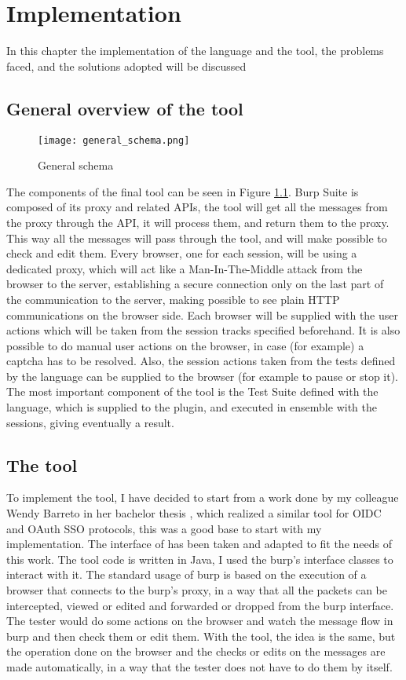 \chapter{Implementation}
\label{chap:Implementation}
In this chapter the implementation of the language and the tool, the problems faced, and the solutions adopted will be discussed

\section{General overview of the tool}
\begin{figure}
    \texttt{[image: general\_schema.png]}
    \caption{General schema}
    \label{fig:general_schema}
\end{figure}

The components of the final tool can be seen in Figure \ref{fig:general_schema}. Burp Suite is composed of its proxy and related APIs, the tool will get all the messages from the proxy through the API, it will process them, and return them to the proxy. This way all the messages will pass through the tool, and will make possible to check and edit them.
Every browser, one for each session, will be using a dedicated proxy, which will act like a Man-In-The-Middle attack from the browser to the server, establishing a secure connection only on the last part of the communication to the server, making possible to see plain HTTP communications on the browser side. Each browser will be supplied with the user actions which will be taken from the session tracks specified beforehand. It is also possible to do manual user actions on the browser, in case (for example) a captcha has to be resolved. Also, the session actions taken from the tests defined by the language can be supplied to the browser (for example to pause or stop it). The most important component of the tool is the Test Suite defined with the language, which is supplied to the plugin, and executed in ensemble with the sessions, giving eventually a result.

\section{The tool}
To implement the tool, I have decided to start from a work done by my colleague Wendy Barreto in her bachelor thesis \cite{wendy_barreto}, which realized a similar tool for \gls{OIDC} and \gls{OAuth} SSO protocols, this was a good base to start with my implementation. The interface of \cite{wendy_barreto} has been taken and adapted to fit the needs of this work. The tool code is written in Java, I used the \Gls{burp}'s interface classes to interact with it.
The standard usage of \Gls{burp} is based on the execution of a browser that connects to the \Gls{burp}'s proxy, in a way that all the packets can be intercepted, viewed or edited and forwarded or dropped from the \Gls{burp} interface. The tester would do some actions on the browser and watch the message flow in \Gls{burp} and then check them or edit them. With the tool, the idea is the same, but the operation done on the browser and the checks or edits on the messages are made automatically, in a way that the tester does not have to do them by itself.

